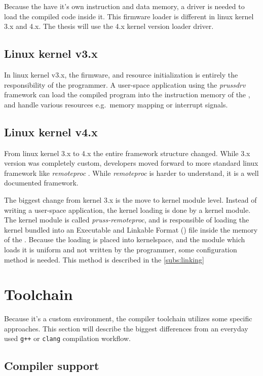 Because the \pru{} have it's own instruction and data memory, a driver is needed to load the compiled code inside it. This firmware loader is different in linux kernel 3.x and 4.x. The thesis will use the 4.x kernel version loader driver.

\subsection{Linux kernel v3.x}

In linux kernel v3.x, the firmware, and resource initialization is entirely the responsibility of the programmer. A user-space application using the \emph{prussdrv} \citep{PRU_PRUSSDRV} framework can load the compiled program into the instruction memory of the \pru, and handle various resources e.g.\ memory mapping or interrupt signals.

\subsection{Linux kernel v4.x}
\label{subsec:fw_loader_kernel4}

From linux kernel 3.x to 4.x the entire framework structure changed. While 3.x version was completely custom, \ti{} developers moved forward to more standard linux framework like \emph{remoteproc} \citep{RPROC}. While \emph{remoteproc} is harder to understand, it is a well documented framework.

The biggest change from kernel 3.x is the move to kernel module level. Instead of writing a user-space application, the kernel loading is done by a kernel module. The kernel module is called \emph{pruss-remoteproc}, and is responsible of loading the kernel bundled into an Executable and Linkable Format (\elf{}) file inside the memory of the \pru. Because the loading is placed into kernelspace, and the module which loads it is uniform and not written by the programmer, some configuration method is needed. This method is described in the \cref{subs:linking}

\section{Toolchain}

Because it's a custom environment, the compiler toolchain utilizes some specific approaches. This section will describe the biggest differences from an everyday used \verb/g++/ or \verb/clang/ compilation workflow.

\subsection{Compiler support}

